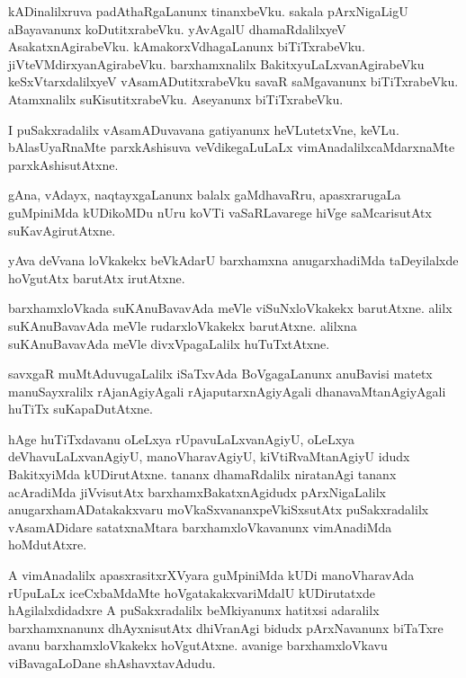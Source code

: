 \documentclass{article}
\begin{document}
\begin{mn}%
kADinalilxruva padAthaRgaLanunx tinanxbeVku. sakala pArxNigaLigU
aBayavanunx koDutitxrabeVku. yAvAgalU dhamaRdalilxyeV
AsakatxnAgirabeVku. kAmakorxVdhagaLanunx
biTiTxrabeVku. jiVteVMdirxyanAgirabeVku. barxhamxnalilx
BakitxyuLaLxvanAgirabeVku keSxVtarxdalilxyeV vAsamADutitxrabeVku savaR
saMgavanunx biTiTxrabeVku. Atamxnalilx suKisutitxrabeVku. Aseyanunx biTiTxrabeVku.
\end{mn}

\begin{mn}
I puSakxradalilx vAsamADuvavana gatiyanunx heVLutetxVne,
keVLu. bAlasUyaRnaMte parxkAshisuva veVdikegaLuLaLx
vimAnadalilxcaMdarxnaMte parxkAshisutAtxne.
\end{mn}

\begin{mn}
gAna, vAdayx, naqtayxgaLanunx balalx gaMdhavaRru, apasxrarugaLa
guMpiniMda kUDikoMDu nUru koVTi vaSaRLavarege hiVge saMcarisutAtx suKavAgirutAtxne.
\end{mn}

\begin{mn}
yAva deVvana loVkakekx beVkAdarU barxhamxna anugarxhadiMda
taDeyilalxde hoVgutAtx barutAtx irutAtxne.
\end{mn}

\begin{mn}%
barxhamxloVkada suKAnuBavavAda meVle viSuNxloVkakekx barutAtxne. alilx
suKAnuBavavAda meVle rudarxloVkakekx barutAtxne. alilxna
suKAnuBavavAda meVle divxVpagaLalilx huTuTxtAtxne.
\end{mn}

\begin{mn}%
savxgaR muMtAduvugaLalilx iSaTxvAda BoVgagaLanunx anuBavisi matetx
manuSayxralilx rAjanAgiyAgali rAjaputarxnAgiyAgali
dhanavaMtanAgiyAgali huTiTx suKapaDutAtxne.
\end{mn}

\begin{mn}
hAge huTiTxdavanu oLeLxya rUpavuLaLxvanAgiyU, oLeLxya
deVhavuLaLxvanAgiyU, manoVharavAgiyU, kiVtiRvaMtanAgiyU idudx
BakitxyiMda kUDirutAtxne. tananx dhamaRdalilx niratanAgi tananx
acAradiMda jiVvisutAtx barxhamxBakatxnAgidudx pArxNigaLalilx
anugarxhamADatakakxvaru moVkaSxvananxpeVkiSxsutAtx puSakxradalilx
vAsamADidare satatxnaMtara barxhamxloVkavanunx vimAnadiMda hoMdutAtxre.
\end{mn}

\begin{mn}%
A vimAnadalilx apasxrasitxrXVyara guMpiniMda kUDi manoVharavAda
rUpuLaLx iceCxbaMdaMte hoVgatakakxvariMdalU kUDirutatxde
hAgilalxdidadxre A puSakxradalilx beMkiyanunx hatitxsi adaralilx
barxhamxnanunx dhAyxnisutAtx dhiVranAgi bidudx pArxNavanunx biTaTxre
avanu barxhamxloVkakekx hoVgutAtxne. avanige barxhamxloVkavu
viBavagaLoDane shAshavxtavAdudu.
\end{mn}
\end{document}
